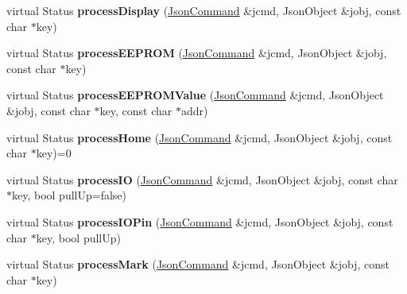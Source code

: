 \begin{DoxyCompactItemize}
\item 
\hypertarget{classfirestep_1_1_json_controller_aad0012ee127086fc26f24bb16474a799}{virtual Status {\bfseries process\+Display} (\hyperlink{classfirestep_1_1_json_command}{Json\+Command} \&jcmd, Json\+Object \&jobj, const char $\ast$key)}\label{classfirestep_1_1_json_controller_aad0012ee127086fc26f24bb16474a799}

\item 
\hypertarget{classfirestep_1_1_json_controller_a3b17dbe58969ed24ce43de28cc2ec1f4}{virtual Status {\bfseries process\+E\+E\+P\+R\+O\+M} (\hyperlink{classfirestep_1_1_json_command}{Json\+Command} \&jcmd, Json\+Object \&jobj, const char $\ast$key)}\label{classfirestep_1_1_json_controller_a3b17dbe58969ed24ce43de28cc2ec1f4}

\item 
\hypertarget{classfirestep_1_1_json_controller_ac53a572f0e97b3fade095091ecbec47d}{virtual Status {\bfseries process\+E\+E\+P\+R\+O\+M\+Value} (\hyperlink{classfirestep_1_1_json_command}{Json\+Command} \&jcmd, Json\+Object \&jobj, const char $\ast$key, const char $\ast$addr)}\label{classfirestep_1_1_json_controller_ac53a572f0e97b3fade095091ecbec47d}

\item 
\hypertarget{classfirestep_1_1_json_controller_a193d58f79d46163316dc6520172873be}{virtual Status {\bfseries process\+Home} (\hyperlink{classfirestep_1_1_json_command}{Json\+Command} \&jcmd, Json\+Object \&jobj, const char $\ast$key)=0}\label{classfirestep_1_1_json_controller_a193d58f79d46163316dc6520172873be}

\item 
\hypertarget{classfirestep_1_1_json_controller_a1a065c8490127a1722d4746d80fb7ddf}{virtual Status {\bfseries process\+I\+O} (\hyperlink{classfirestep_1_1_json_command}{Json\+Command} \&jcmd, Json\+Object \&jobj, const char $\ast$key, bool pull\+Up=false)}\label{classfirestep_1_1_json_controller_a1a065c8490127a1722d4746d80fb7ddf}

\item 
\hypertarget{classfirestep_1_1_json_controller_af6211759689e5f895a584b5d1f9b15ef}{virtual Status {\bfseries process\+I\+O\+Pin} (\hyperlink{classfirestep_1_1_json_command}{Json\+Command} \&jcmd, Json\+Object \&jobj, const char $\ast$key, bool pull\+Up)}\label{classfirestep_1_1_json_controller_af6211759689e5f895a584b5d1f9b15ef}

\item 
\hypertarget{classfirestep_1_1_json_controller_a6ebf943b4d72b23bc691427993711e63}{virtual Status {\bfseries process\+Mark} (\hyperlink{classfirestep_1_1_json_command}{Json\+Command} \&jcmd, Json\+Object \&jobj, const char $\ast$key)}\label{classfirestep_1_1_json_controller_a6ebf943b4d72b23bc691427993711e63}


\end{DoxyCompactItemize}
